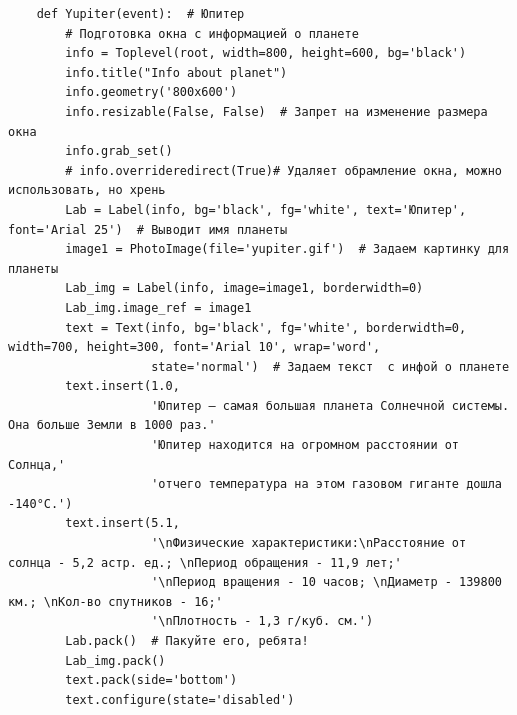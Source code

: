 \documentclass[11pt,a4paper]{report}
\begin{document}
\begin{verbatim}
    def Yupiter(event):  # Юпитер
        # Подготовка окна с информацией о планете
        info = Toplevel(root, width=800, height=600, bg='black')
        info.title("Info about planet")
        info.geometry('800x600')
        info.resizable(False, False)  # Запрет на изменение размера окна
        info.grab_set()
        # info.overrideredirect(True)# Удаляет обрамление окна, можно использовать, но хрень
        Lab = Label(info, bg='black', fg='white', text='Юпитер', font='Arial 25')  # Выводит имя планеты
        image1 = PhotoImage(file='yupiter.gif')  # Задаем картинку для планеты
        Lab_img = Label(info, image=image1, borderwidth=0)
        Lab_img.image_ref = image1
        text = Text(info, bg='black', fg='white', borderwidth=0, width=700, height=300, font='Arial 10', wrap='word',
                    state='normal')  # Задаем текст  с инфой о планете
        text.insert(1.0,
                    'Юпитер — самая большая планета Солнечной системы. Она больше Земли в 1000 раз.'
                    'Юпитер находится на огромном расстоянии от Солнца,'
                    'отчего температура на этом газовом гиганте дошла -140°С.')
        text.insert(5.1,
                    '\nФизические характеристики:\nРасстояние от солнца - 5,2 астр. ед.; \nПериод обращения - 11,9 лет;'
                    '\nПериод вращения - 10 часов; \nДиаметр - 139800 км.; \nКол-во спутников - 16;'
                    '\nПлотность - 1,3 г/куб. см.')
        Lab.pack()  # Пакуйте его, ребята!
        Lab_img.pack()
        text.pack(side='bottom')
        text.configure(state='disabled')


\end{verbatim}
\end{document}
